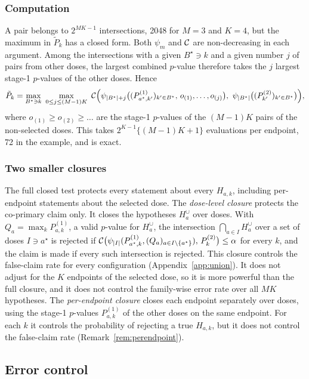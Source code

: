 \subsubsection{Computation}
A pair belongs to $2^{MK-1}$ intersections, 2048 for $M=3$ and $K=4$, but the maximum in $\tilde P_k$ has a closed form. Both $\psi_m$ and $\mathcal{C}$ are non-decreasing in each argument. Among the intersections with a given $B^\star\ni k$ and a given number $j$ of pairs from other doses, the largest combined $p$-value therefore takes the $j$ largest stage-1 $p$-values of the other doses. Hence
\begin{equation}\label{eq:shortcut}
\tilde P_k=\max_{B^\star\ni k}\ \max_{0\le j\le(M-1)K}\ \cC\Big(\psi_{|B^\star|+j}\big((P^{(1)}_{a^\star,k'})_{k'\in B^\star},\,o_{(1)},\dots,o_{(j)}\big),\ \psi_{|B^\star|}\big((P^{(2)}_{k'})_{k'\in B^\star}\big)\Big),
\end{equation}
where $o_{(1)}\ge o_{(2)}\ge\dots$ are the stage-1 $p$-values of the $(M-1)K$ pairs of the non-selected doses. This takes $2^{K-1}\{(M-1)K+1\}$ evaluations per endpoint, 72 in the example, and is exact.

\subsubsection{Two smaller closures}
The full closed test protects every statement about every $H_{a,k}$, including per-endpoint statements about the selected dose. The \emph{dose-level closure} protects the co-primary claim only. It closes the hypotheses $H^\cup_a$ over doses. With $Q_a=\max_kP^{(1)}_{a,k}$, a valid $p$-value for $H^\cup_a$, the intersection $\bigcap_{a\in I}H^\cup_a$ over a set of doses $I\ni a^\star$ is rejected if $\mathcal{C}\big(\psi_{|I|}(P^{(1)}_{a^\star,k},(Q_a)_{a\in I\setminus\{a^\star\}}),\,P^{(2)}_k\big)\le\alpha$ for every $k$, and the claim is made if every such intersection is rejected. This closure controls the false-claim rate for every configuration (Appendix~\ref{app:union}). It does not adjust for the $K$ endpoints of the selected dose, so it is more powerful than the full closure, and it does not control the family-wise error rate over all $MK$ hypotheses. The \emph{per-endpoint closure} closes each endpoint separately over doses, using the stage-1 $p$-values $P^{(1)}_{a,k}$ of the other doses on the same endpoint. For each $k$ it controls the probability of rejecting a true $H_{a,k}$, but it does not control the false-claim rate (Remark~\ref{rem:perendpoint}).

\subsection{Error control}\label{sec:t1e}

